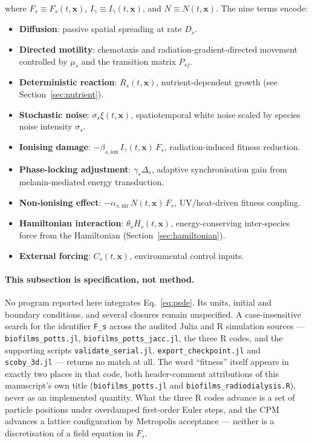 \documentclass[11pt]{article}
\begin{document}
\noindent where $F_s \equiv F_s(t,\mathbf{x})$, $I_\gamma \equiv I_\gamma(t,\mathbf{x})$, and
$N \equiv N(t,\mathbf{x})$.  The nine terms encode:
\begin{itemize}\setlength\itemsep{2pt}
  \item \textbf{Diffusion}: passive spatial spreading at rate $D_s$.
  \item \textbf{Directed motility}: chemotaxis and radiation-gradient-directed movement
        controlled by $\mu_s$ and the transition matrix $P_{sj}$.
  \item \textbf{Deterministic reaction}: $R_s(t,\mathbf{x})$, nutrient-dependent growth
        (see Section~\ref{sec:nutrient}).
  \item \textbf{Stochastic noise}: $\sigma_s\xi(t,\mathbf{x})$, spatiotemporal white noise
        scaled by species noise intensity $\sigma_s$.
  \item \textbf{Ionising damage}: $-\beta_{s,\mathrm{ion}}\,I_\gamma(t,\mathbf{x})\,F_s$,
        radiation-induced fitness reduction.
  \item \textbf{Phase-locking adjustment}: $\gamma_s\Delta_s$, adaptive synchronisation gain
        from melanin-mediated energy transduction.
  \item \textbf{Non-ionising effect}: $-\alpha_{s,\mathrm{nir}}\,N(t,\mathbf{x})\,F_s$,
        UV/heat-driven fitness coupling.
  \item \textbf{Hamiltonian interaction}: $\theta_s H_s(t,\mathbf{x})$, energy-conserving
        inter-species force from the Hamiltonian (Section~\ref{sec:hamiltonian}).
  \item \textbf{External forcing}: $C_s(t,\mathbf{x})$, environmental control inputs.
\end{itemize}

\paragraph{This subsection is specification, not method.}
No program reported here integrates Eq.~\ref{eq:psde}. Its units, initial and boundary
conditions, and several closures remain unspecified. A case-insensitive search for the identifier \texttt{F\_s} across the audited
Julia and R simulation sources --- \texttt{biofilms\_potts.jl}, \texttt{biofilms\_potts\_jacc.jl},
the three R codes, and the supporting scripts \texttt{validate\_serial.jl},
\texttt{export\_checkpoint.jl} and \texttt{scoby\_3d.jl} --- returns no match at all. The word
``fitness'' itself appears in exactly two places in that code, both header-comment attributions
of this manuscript's own title (\texttt{biofilms\_potts.jl} and
\texttt{biofilms\_radiodialysis.R}), never as an implemented quantity. What the three R codes
advance is a set of particle positions under overdamped first-order Euler steps, and the CPM
advances a lattice configuration by Metropolis acceptance --- neither is a discretisation of a
field equation in $F_s$.
\end{document}
